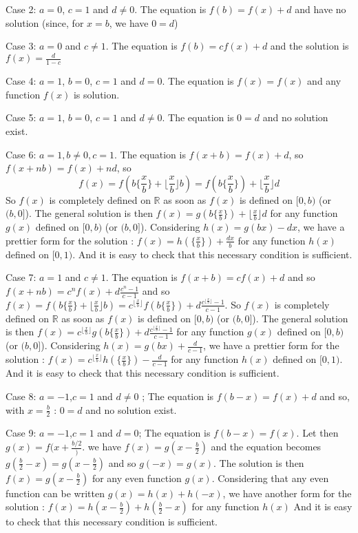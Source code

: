 \begin{mysolution}
Case 2: $ a = 0$, $ c = 1$ and $ d\neq0$. The equation is $ f(b) = f(x) + d$ and have no solution (since, for $ x = b$, we have $ 0 = d$)

Case 3: $ a = 0$ and $ c\neq 1$. The equation is $ f(b) = cf(x) + d$ and the solution is $ f(x) = \frac {d}{1 - c}$

Case 4: $ a = 1$, $ b = 0$, $ c = 1$ and $ d = 0$. The equation is $ f(x) = f(x)$ and any function $ f(x)$ is solution.

Case 5: $ a = 1$, $ b = 0$, $ c = 1$ and $ d\neq 0$. The equation is $ 0 = d$ and no solution exist.

Case 6: $ a = 1, b\neq 0, c = 1$. The equation is $ f(x+b)=f(x)+d$, so $ f(x + nb) = f(x) + nd$, so \[f(x) = f(b\{\frac {x}{b}\} + \lfloor\frac {x}{b}\rfloor b) = f(b\{\frac {x}{b}\}) + \lfloor\frac {x}{b}\rfloor d\]
So $ f(x)$ is completely defined on $ \mathbb{R}$ as soon as $ f(x)$ is defined on $ [0,b)$ (or $ (b,0]$).
The general solution is then $ f(x) = g(b\{\frac {x}{b}\}) + \lfloor\frac {x}{b}\rfloor d$ for any function $ g(x)$ defined on $ [0,b)$ (or $ (b,0]$).
Considering $ h(x) = g(bx) - dx$, we have a prettier form for the solution : $ f(x) = h(\{\frac {x}{b}\}) + \frac {dx}{b}$ for any function $ h(x)$ defined on $ [0,1)$.
And it is easy to check that this necessary condition is sufficient.

Case 7: $ a = 1$ and $ c\neq 1$. The equation is $ f(x + b) = cf(x) + d$ and so $ f(x + nb) = c^nf(x) + d\frac {c^n - 1}{c - 1}$ and so $ f(x) = f(b\{\frac {x}{b}\} + \lfloor\frac {x}{b}\rfloor b) = c^{\lfloor\frac {x}{b}\rfloor }f(b\{\frac {x}{b}\}) + d\frac {c^{\lfloor\frac {x}{b}\rfloor } - 1}{c - 1}$.
So $ f(x)$ is completely defined on $ \mathbb{R}$ as soon as $ f(x)$ is defined on $ [0,b)$ (or $ (b,0]$).
The general solution is then $ f(x) = c^{\lfloor\frac {x}{b}\rfloor }g(b\{\frac {x}{b}\}) + d\frac {c^{\lfloor\frac {x}{b}\rfloor } - 1}{c - 1}$ for any function $ g(x)$ defined on $ [0,b)$ (or $ (b,0]$).
Considering $ h(x) = g(bx) + \frac {d}{c - 1}$, we have a prettier form for the solution : $ f(x) = c^{\lfloor\frac {x}{b}\rfloor }h(\{\frac {x}{b}\}) - \frac {d}{c - 1}$ for any function $ h(x)$ defined on $ [0,1)$.
And it is easy to check that this necessary condition is sufficient.

Case 8: $ a = - 1$,$ c = 1$ and $ d\neq 0$ ; The equation is $ f(b - x) = f(x) + d$ and so, with $ x = \frac {b}{2}$ : $ 0 = d$ and no solution exist.

Case 9: $ a = - 1$,$ c = 1$ and $ d = 0$; The equation is $ f(b - x) = f(x)$. Let then $ g(x) = f(x + \frac {b/2})$. we have $ f(x) = g(x - \frac {b}{2})$ and the equation becomes $ g(\frac {b}{2} - x) = g(x - \frac {b}{2})$ and so $ g( - x) = g(x)$.
The solution is then $ f(x) = g(x - \frac {b}{2})$ for any even function $ g(x)$.
Considering that any even function can be written $ g(x) = h(x) + h( - x)$, we have another form for the solution :
$ f(x) = h(x - \frac {b}{2}) + h(\frac {b}{2} - x)$  for any function $ h(x)$
And it is easy to check that this necessary condition is sufficient.


\end{mysolution}

